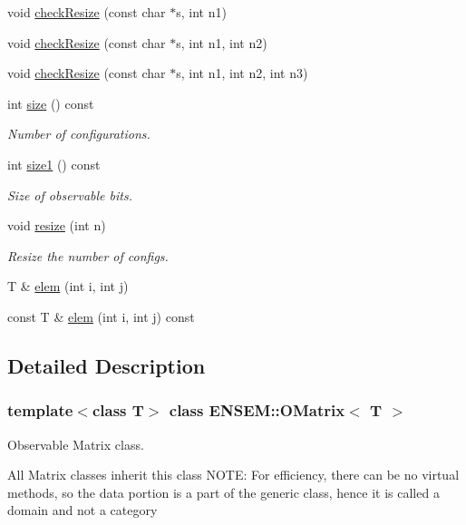 \begin{DoxyCompactItemize}
\item 
void \mbox{\hyperlink{classENSEM_1_1OMatrix_a04fb9c7a5ca8da8a54aff3a8bafec571}{check\+Resize}} (const char $\ast$s, int n1)
\item 
void \mbox{\hyperlink{classENSEM_1_1OMatrix_aa9d9ff7da2027f85535b36b472ef125b}{check\+Resize}} (const char $\ast$s, int n1, int n2)
\item 
void \mbox{\hyperlink{classENSEM_1_1OMatrix_a532d2138ecffc7a153b831401ca8b4df}{check\+Resize}} (const char $\ast$s, int n1, int n2, int n3)
\item 
int \mbox{\hyperlink{classENSEM_1_1OMatrix_a837821b951450cd49d3db25f566f5e47}{size}} () const
\begin{DoxyCompactList}\small\item\em Number of configurations. \end{DoxyCompactList}\item 
int \mbox{\hyperlink{classENSEM_1_1OMatrix_a850b4d2a93be69f82df4a2d0165bc397}{size1}} () const
\begin{DoxyCompactList}\small\item\em Size of observable bits. \end{DoxyCompactList}\item 
void \mbox{\hyperlink{classENSEM_1_1OMatrix_abb999e63b84b6d958e43443dc04e46be}{resize}} (int n)
\begin{DoxyCompactList}\small\item\em Resize the number of configs. \end{DoxyCompactList}\item 
T \& \mbox{\hyperlink{classENSEM_1_1OMatrix_a0a15388ff6dc8159664f6dc14a35b399}{elem}} (int i, int j)
\item 
const T \& \mbox{\hyperlink{classENSEM_1_1OMatrix_a27e0c9e142522126542006530bd7007b}{elem}} (int i, int j) const
\end{DoxyCompactItemize}


\subsection{Detailed Description}
\subsubsection*{template$<$class T$>$\newline
class E\+N\+S\+E\+M\+::\+O\+Matrix$<$ T $>$}

Observable Matrix class. 

All Matrix classes inherit this class N\+O\+TE\+: For efficiency, there can be no virtual methods, so the data portion is a part of the generic class, hence it is called a domain and not a category 

